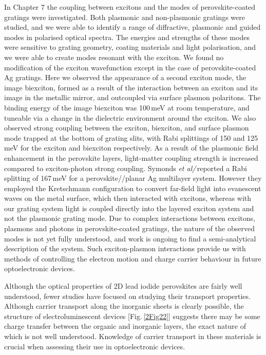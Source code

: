In Chapter 7 the coupling between excitons and the modes of perovskite-coated gratings were investigated. Both plasmonic and non-plasmonic gratings were studied, and we were able to identify a range of diffractive, plasmonic and guided modes in polarised optical spectra. The energies and strengths of these modes were sensitive to grating geometry, coating materials and light polarisation, and we were able to create modes resonant with the exciton. We found no modification of the exciton wavefunction except in the case of perovskite-coated Ag gratings. Here we observed the appearance of a second exciton mode, the image biexciton, formed as a result of the interaction between an exciton and its image in the metallic mirror, and outcoupled via surface plasmon polaritons. The binding energy of the image biexciton was 100\,meV at room temperature, and tuneable via a change in the dielectric environment around the exciton. We also observed strong coupling between the exciton, biexciton, and surface plasmon mode trapped at the bottom of grating slits, with Rabi splittings of 150 and 125\,meV for the exciton and biexciton respectively. %
As a result of the plasmonic field enhancement in the perovskite layers, light-matter coupling strength is increased compared to exciton-photon strong coupling. Symonds \textit{et al/}\,reported a Rabi splitting of 167\,meV for a perovskite//planar Ag multilayer system. However they employed the Kretschmann configuration to convert far-field light into evanescent waves on the metal surface, which then interacted with excitons, whereas with our grating system light is coupled directly into the layered exciton system and not the plasmonic grating mode. Due to complex interactions between excitons, plasmons and photons in perovskite-coated gratings, the nature of the observed modes is not yet fully understood, and work is ongoing to find a semi-analytical description of the system. Such exciton-plasmon interactions provide us with methods of controlling the electron motion and charge carrier behaviour in future optoelectronic devices. %

Although the optical properties of 2D lead iodide perovskites are fairly well understood, fewer studies have focused on studying their transport properties. Although carrier transport along the inorganic sheets is clearly possible, the structure of electroluminescent devices [Fig.\,\ref{2Fig22}] suggests there may be some charge transfer between the organic and inorganic layers, the exact nature of which is not well understood. Knowledge of carrier transport in these materials is crucial when assessing their use in optoelectronic devices.

